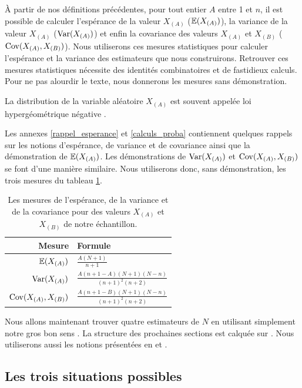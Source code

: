 \documentclass[10pt]{article}
\begin{document}
À partir de nos définitions précédentes, pour tout entier \(A\) entre 1
et \(n\), il est possible de calculer l'espérance de la valeur
\(X_{(A)}\) (\(\operatorname{\mathbb{E}} (X_{(A)})\)), la variance de la valeur \(X_{(A)}\)
(\(\operatorname{Var}(X_{(A)})\)) et enfin la covariance des valeurs \(X_{(A)}\) et
\(X_{(B)}\) (\(\operatorname{Cov}(X_{(A)},X_{(B)})\)). Nous utiliserons ces mesures
statistiques pour calculer l'espérance et la variance des estimateurs
que nous construirons. Retrouver ces mesures statistiques nécessite des
identités combinatoires et de fastidieux calculs. Pour ne pas alourdir
le texte, nous donnerons les mesures sans démonstration.

La distribution de la variable aléatoire \(X_{(A)}\) est souvent appelée
loi hypergéométrique négative \cite{WikiHypergeometric}.

Les annexes \ref{rappel_esperance} et \ref{calculs_proba} contiennent
quelques rappels sur les notions d'espérance, de variance et de
covariance ainsi que la démonstration de \(\operatorname{\mathbb{E}}(X_{(A)})\). Les
démonstrations de \(\operatorname{Var}(X_{(A)})\) et \(\operatorname{Cov}(X_{(A)},X_{(B)})\) se font
d'une manière similaire. Nous utiliserons donc, sans démonstration, les
trois mesures du tableau \ref{tab:mesures_stat}.

\begin{table}[ht]
\begin{center}
\begin{tabular}{rl}
\toprule
Mesure & Formule \\
\midrule
$\operatorname{\mathbb{E}} (X_{(A)})$ & $\frac{A(N+1)}{n+1}$ \\ 
\midrule
$\operatorname{Var}(X_{(A)})$ & $\frac{A(n+1-A)(N+1)(N-n)}{(n+1)^2(n+2)}$ \\
\midrule
$\operatorname{Cov}(X_{(A)},X_{(B)})$ & $\frac{A(n+1-B)(N+1)(N-n)}{(n+1)^2(n+2)}$ \\
\bottomrule
\end{tabular}
\end{center}
\caption{\label{tab:mesures_stat} {Les mesures de l'espérance, de la variance et de la covariance pour des valeurs $X_{(A)}$ et $X_{(B)}$ de notre échantillon.} }
\end{table}

Nous allons maintenant trouver quatre estimateurs de \(N\) en utilisant
simplement notre \og gros bon sens \fg{}. La structure des prochaines
sections est calquée sur \cite{Johnson}. Nous utiliserons aussi les
notions présentées en \cite{Goodman1952} et \cite{Goodman1954}.

\hypertarget{les-trois-situations-possibles}{%
\subsection{Les trois situations
possibles}\label{les-trois-situations-possibles}}
\end{document}
